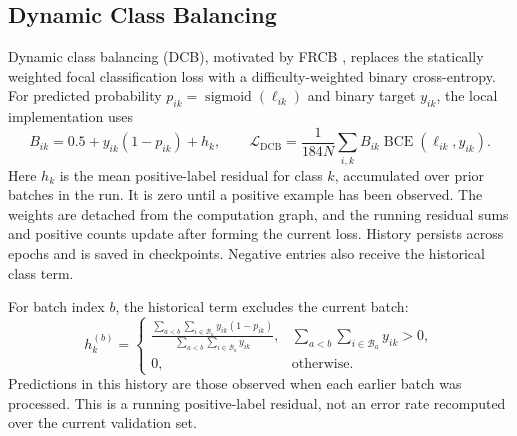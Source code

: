\clearpage
\begin{samepage}
\section{Dynamic Class Balancing}

\par
\end{samepage}

Dynamic class balancing (DCB), motivated by FRCB \cite{frcb}, replaces the statically weighted focal classification loss with a difficulty-weighted binary cross-entropy. For predicted probability \(p_{ik}=\operatorname{sigmoid}(\ell_{ik})\) and binary target \(y_{ik}\), the local implementation uses
\begin{equation}\label{eq:dcb}
 B_{ik}=0.5+y_{ik}(1-p_{ik})+h_k,\qquad
 \mathcal{L}_{\mathrm{DCB}}=\frac{1}{184N}\sum_{i,k}B_{ik}\operatorname{BCE}(\ell_{ik},y_{ik}).
\end{equation}
Here \(h_k\) is the mean positive-label residual for class \(k\), accumulated over prior batches in the run. It is zero until a positive example has been observed. The weights are detached from the computation graph, and the running residual sums and positive counts update after forming the current loss. History persists across epochs and is saved in checkpoints. Negative entries also receive the historical class term.

For batch index \(b\), the historical term excludes the current batch:
\begin{equation}\label{eq:dcb-history}
 h_k^{(b)}=\begin{cases}
 \displaystyle\frac{\sum_{a<b}\sum_{i\in\mathcal B_a}y_{ik}(1-p_{ik})}
 {\sum_{a<b}\sum_{i\in\mathcal B_a}y_{ik}}, & \displaystyle\sum_{a<b}\sum_{i\in\mathcal B_a}y_{ik}>0,\\[6pt]
 0, & \text{otherwise}.
 \end{cases}
\end{equation}
Predictions in this history are those observed when each earlier batch was processed. This is a running positive-label residual, not an error rate recomputed over the current validation set.

